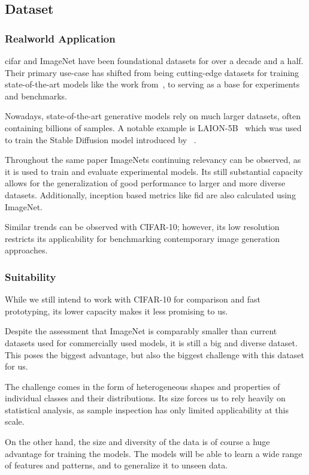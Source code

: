 \subsection{Dataset}\label{subsec:dataset}

\subsubsection{Realworld Application}
\ac{cifar} and ImageNet have been foundational datasets for over a decade and a half.
Their primary use-case has shifted from being cutting-edge datasets for training state-of-the-art models like the
work from~\cite{AlexNet}, to serving as a base for experiments and benchmarks.

Nowadays, state-of-the-art generative models rely on much larger datasets, often containing billions of samples.
A notable example is LAION-5B~\cite{laion5b} which was used to train the Stable Diffusion model introduced by~
\cite{stable_diff}.

Throughout the same paper ImageNets continuing relevancy can be observed, as it is used to train and evaluate
experimental models.
Its still substantial capacity allows for the generalization of good performance to larger and more diverse datasets.
Additionally, inception based metrics like \ac{fid} are also calculated using ImageNet.

Similar trends can be observed with CIFAR-10; however, its low resolution restricts its applicability for
benchmarking contemporary image generation approaches.

\subsubsection{Suitability}
While we still intend to work with CIFAR-10 for comparison and fast prototyping, its lower capacity makes it less
promising to us.

Despite the assessment that ImageNet is comparably smaller than current datasets used for commercially used models, it is
still a big and diverse dataset.
This poses the biggest advantage, but also the biggest challenge with this dataset for us.

The challenge comes in the form of heterogeneous shapes and properties of individual classes and their distributions.
Its size forces us to rely heavily on statistical analysis, as sample inspection has only limited applicability at
this scale.

On the other hand, the size and diversity of the data is of course a huge advantage for training the models.
The models will be able to learn a wide range of features and patterns, and to generalize it to unseen data.

